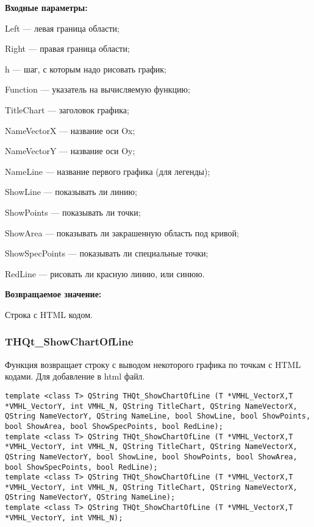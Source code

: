 \documentclass[a4paper,12pt]{article}
\begin{document}
\textbf{Входные параметры:}
 
    Left --- левая граница области;
 
    Right --- правая граница области;
 
    h --- шаг, с которым надо рисовать график;
 
    Function --- указатель на вычисляемую функцию;
 
    TitleChart --- заголовок графика;
 
    NameVectorX --- название оси Ox;
 
    NameVectorY --- название оси Oy;
 
    NameLine --- название первого графика (для легенды);
 
    ShowLine --- показывать ли линию;
 
    ShowPoints --- показывать ли точки;
 
    ShowArea --- показывать ли закрашенную область под кривой;
 
    ShowSpecPoints --- показывать ли специальные точки;
 
    RedLine --- рисовать ли красную линию, или синюю.

\textbf{Возвращаемое значение:}

Строка с HTML кодом.


\subsubsection{THQt\_ShowChartOfLine}\label{THQt_ShowChartOfLine}

Функция возвращает строку с выводом некоторого графика по точкам с HTML кодами. Для добавление в html файл.


\begin{lstlisting}[label=code_syntax_THQt_ShowChartOfLine,caption=Синтаксис]
template <class T> QString THQt_ShowChartOfLine (T *VMHL_VectorX,T *VMHL_VectorY, int VMHL_N, QString TitleChart, QString NameVectorX, QString NameVectorY, QString NameLine, bool ShowLine, bool ShowPoints, bool ShowArea, bool ShowSpecPoints, bool RedLine);
template <class T> QString THQt_ShowChartOfLine (T *VMHL_VectorX,T *VMHL_VectorY, int VMHL_N, QString TitleChart, QString NameVectorX, QString NameVectorY, bool ShowLine, bool ShowPoints, bool ShowArea, bool ShowSpecPoints, bool RedLine);
template <class T> QString THQt_ShowChartOfLine (T *VMHL_VectorX,T *VMHL_VectorY, int VMHL_N, QString TitleChart, QString NameVectorX, QString NameVectorY, QString NameLine);
template <class T> QString THQt_ShowChartOfLine (T *VMHL_VectorX,T *VMHL_VectorY, int VMHL_N);
\end{lstlisting}
\end{document}

